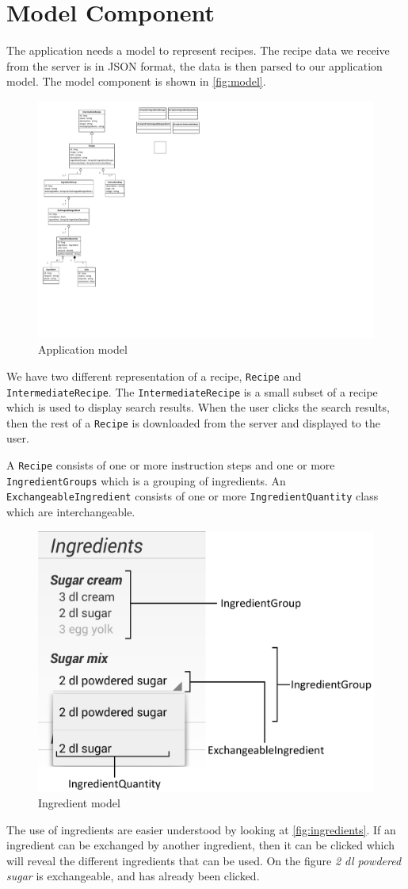 \pagebreak
\section{Model Component}

The application needs a model to represent recipes. The recipe data we receive from the server is in JSON format, the data is then parsed to our application model. The model component is shown in \autoref{fig:model}.

\begin{figure}[H]
\centering
\includegraphics[width=0.67\linewidth, page=2]{img/model.pdf}
\caption{Application model}
\label{fig:model}
\end{figure}

We have two different representation of a recipe, \lstinline|Recipe| and \lstinline|IntermediateRecipe|. The \lstinline|IntermediateRecipe| is a small subset of a recipe which is used to display search results. When the user clicks the search results, then the rest of a \lstinline|Recipe| is downloaded from the server and displayed to the user.

A \lstinline|Recipe| consists of one or more instruction steps and one or more \lstinline|IngredientGroups| which is a grouping of ingredients. An \lstinline|ExchangeableIngredient| consists of one or more \lstinline|IngredientQuantity| class which are interchangeable. 

\begin{figure}[H]
\centering
\includegraphics[width=0.6\linewidth]{img/ingredients.pdf}
\caption{Ingredient model}
\label{fig:ingredients}
\end{figure}
The use of ingredients are easier understood by looking at \autoref{fig:ingredients}. If an ingredient can be exchanged by another ingredient, then it can be clicked which will reveal the different ingredients that can be used. On the figure \textit{2 dl powdered sugar} is exchangeable, and has already been clicked.


